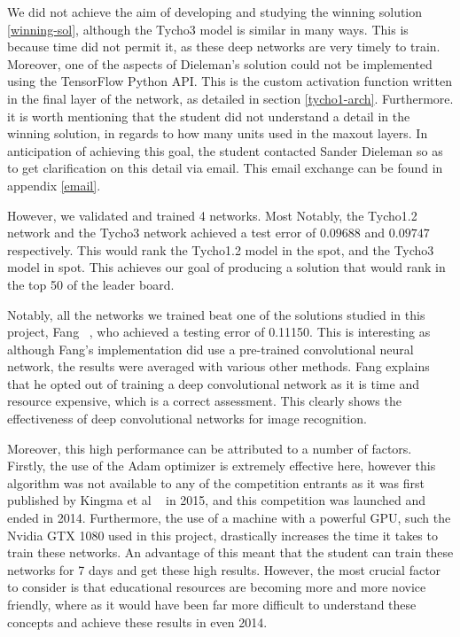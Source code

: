\documentclass[12pt,a4paper,oneside,oldfontcommands]{memoir}
\begin{document}
\begin{Declaration Of OriginalityOrginality}
We did not achieve the aim of developing and studying the winning solution \ref{winning-sol}, although the Tycho3 model is similar in many ways. This is because time did not permit it, as these deep networks are very timely to train. Moreover, one of the  aspects of Dieleman's solution could not be implemented using the TensorFlow Python API. This is the custom activation function written in the final layer of the network, as detailed in section \ref{tycho1-arch}. Furthermore. it is worth mentioning that the student did not understand a detail in the winning solution, in regards to how many units used in the maxout layers. In anticipation of achieving this goal, the student contacted Sander Dieleman so as to get clarification on this detail via email. This email exchange can be found in appendix \ref{email}.

However, we validated and trained 4 networks. Most Notably, the Tycho1.2 network and the Tycho3 network achieved a test error of \(0.09688\) and \(0.09747\) respectively. This would rank the Tycho1.2 model in the  spot, and the Tycho3 model in  spot. This achieves our goal of producing a solution that would rank in the top 50 of the leader board. 

Notably, all the networks we trained beat one of the solutions studied in this project, Fang ~\cite{Fang}, who achieved a testing error of 0.11150. This is interesting as although Fang's implementation did use a pre-trained convolutional neural network, the results were averaged with various other methods. Fang explains that he opted out of training a deep convolutional network as it is time and resource expensive, which is a correct assessment. This clearly shows the effectiveness of deep convolutional networks for image recognition.

Moreover, this high performance can be attributed to a number of factors. Firstly, the use of the Adam optimizer is extremely effective here, however this algorithm was not available to any of the competition entrants as it was first published by Kingma et al ~\cite{Kingma} in 2015, and this competition was launched and ended in 2014. Furthermore, the use of a machine with a powerful GPU, such the Nvidia GTX 1080 used in this project, drastically increases the time it takes to train these networks. An advantage of this meant that the student can train these networks for 7 days and get these high results. However, the most crucial factor to consider is that educational resources are becoming more and more novice friendly, where as it would have been far more difficult to understand these concepts and achieve these results in even 2014.


\end{Declaration Of OriginalityOrginality}
\end{document}
